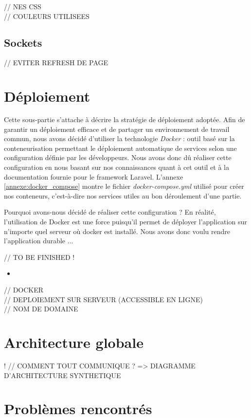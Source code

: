 \documentclass{tnreport}
\begin{document}
// NES CSS \\
// COULEURS UTILISEES

\subsection{Sockets}

// EVITER REFRESH DE PAGE

\section{Déploiement}

Cette sous-partie s'attache à décrire la stratégie de déploiement adoptée. Afin de garantir un déploiement efficace et de partager un environnement de travail commun, nous avons décidé d'utiliser la technologie \textit{Docker} : outil basé sur la conteneurisation permettant le déploiement automatique de services selon une configuration définie par les développeurs. Nous avons donc dû réaliser cette configuration en nous basant sur nos connaissances quant à cet outil et à la documentation fournie pour le framework Laravel. L'annexe \ref{annexe:docker_compose} montre le fichier \textit{docker-compose.yml} utilisé pour créer nos conteneurs, c'est-à-dire nos services utiles au bon déroulement d'une partie.

Pourquoi avons-nous décidé de réaliser cette configuration ? En réalité, l'utilisation de Docker est une force puisqu'il permet de déployer l'application sur n'importe quel serveur où docker est installé. Nous avons donc voulu rendre l'application durable ...

// TO BE FINISHED !

\begin{itemize}
	\item 
\end{itemize}

// DOCKER \\
// DEPLOIEMENT SUR SERVEUR (ACCESSIBLE EN LIGNE) \\
// NOM DE DOMAINE \\

\section{Architecture globale}
!
// COMMENT TOUT COMMUNIQUE ? => DIAGRAMME D'ARCHITECTURE SYNTHETIQUE

\section{Problèmes rencontrés}
\end{document}
